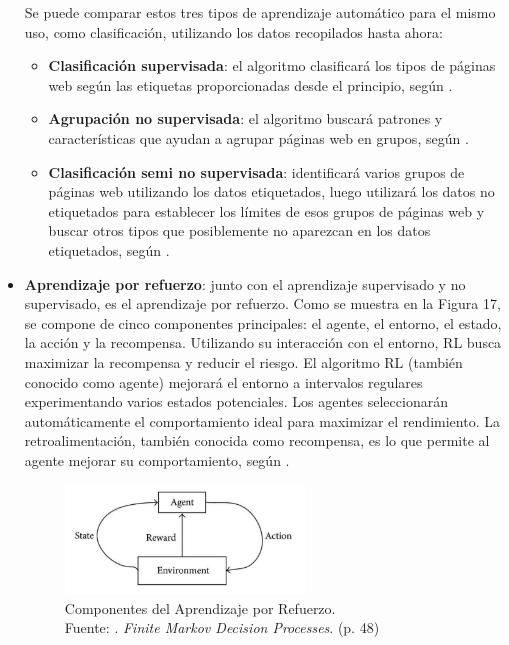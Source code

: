 \begin{itemize}
	Se puede comparar estos tres tipos de aprendizaje automático para el mismo uso, como clasificación, utilizando los datos recopilados hasta ahora:

	\begin{itemize}
		\item \textbf{Clasificación supervisada}: el algoritmo clasificará los tipos de páginas web según las etiquetas proporcionadas desde el principio, según \parencite{bk_zambrano2018supnosup}.
		\item \textbf{Agrupación no supervisada}: el algoritmo buscará patrones y características que ayudan a agrupar páginas web en grupos, según \parencite{bk_zambrano2018supnosup}.
		\item \textbf{Clasificación semi no supervisada}: identificará varios grupos de páginas web utilizando los datos etiquetados, luego utilizará los datos no etiquetados para establecer los límites de esos grupos de páginas web y buscar otros tipos que posiblemente no aparezcan en los datos etiquetados, según \parencite{bk_zambrano2018supnosup}.
	\end{itemize}
	

	\item \textbf{Aprendizaje por refuerzo}: junto con el aprendizaje supervisado y no supervisado, es el aprendizaje por refuerzo. Como se muestra en la Figura 17, se compone de cinco componentes principales: el agente, el entorno, el estado, la acción y la recompensa. Utilizando su interacción con el entorno, RL busca maximizar la recompensa y reducir el riesgo. El algoritmo RL (también conocido como agente) mejorará el entorno a intervalos regulares experimentando varios estados potenciales. Los agentes seleccionarán automáticamente el comportamiento ideal para maximizar el rendimiento. La retroalimentación, también conocida como recompensa, es lo que permite al agente mejorar su comportamiento, según \parencite{bk_sutton2018rl}.
	
	\begin{figure}[h]
		\begin{center}
			\includegraphics[width=0.60\textwidth]{2/figures/aprendizaje_refuerzo.jpg}
			\caption[Componentes del Aprendizaje por Refuerzo]{Componentes del Aprendizaje por Refuerzo.\\
				Fuente: \cite{bk_sutton2018rl}. \textit{Finite Markov Decision Processes}. (p. 48)}
			\label{2:fig4}
		\end{center}
	\end{figure}
	
\end{itemize}

